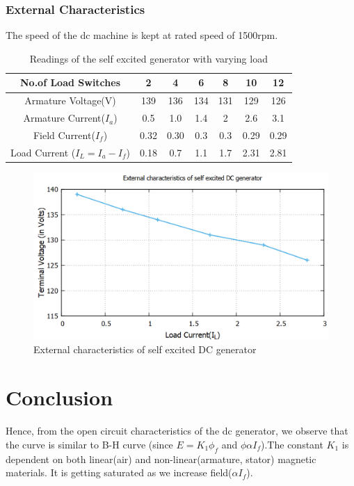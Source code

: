 \documentclass[12pt]{article}
\begin{document}
    \subsubsection{External Characteristics}
    The speed of the dc machine is kept at rated speed of 1500rpm.
    \begin{table}[H]
        \centering
        \begin{tabular}{||c||c|c|c|c|c|c||}
          \hline
          \hline
            No.of Load Switches & 2  & 4 & 6 & 8 & 10 & 12 \\
            \hline
            Armature Voltage(V) &	139	& 136 & 134 & 131 & 129 & 126\\
            \hline
            Armature Current($I_a$) & 0.5	& 1.0 & 1.4 & 2 & 2.6 & 3.1\\
            \hline
            Field Current($I_f$) & 0.32 & 0.30 & 0.3 & 0.3 & 0.29 & 0.29\\
            \hline
            Load Current ($I_L=I_a-I_f$)& 0.18 & 0.7 & 1.1 & 1.7 & 2.31 & 2.81 \\
            \hline
            \hline
        \end{tabular}
        \caption{Readings of the self excited generator with varying load}
        \label{tab:my_label}
    \end{table}
    \begin{figure}[ht]
        \centering
        \includegraphics[scale=0.5]{ese.png}
        \caption{External characteristics of self excited DC generator}
        \label{fig:my_label}
    \end{figure}
    \section{Conclusion}
    Hence, from the open circuit characteristics of the dc generator, we observe that the curve is similar to B-H curve (since $E=K_1\phi_f$ and $\phi\alpha I_f$).The constant $K_1$ is dependent on both linear(air) and non-linear(armature, stator) magnetic materials. It is getting saturated as we increase field($\alpha I_f$).
    
\end{document}
